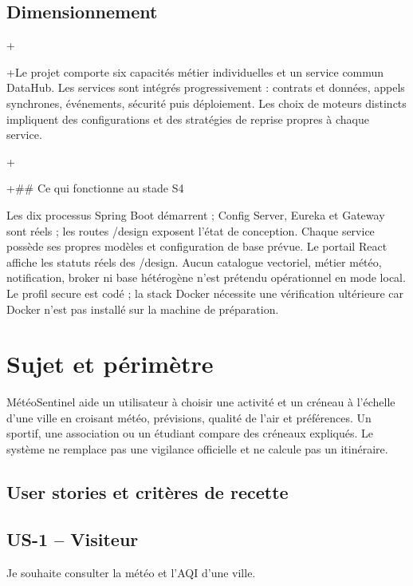 \documentclass[10pt,a4paper]{article}
\begin{document}
\subsection*{Dimensionnement}
+\par
+Le projet comporte six capacités métier individuelles et un service commun DataHub. Les services sont intégrés progressivement : contrats et données, appels synchrones, événements, sécurité puis déploiement. Les choix de moteurs distincts impliquent des configurations et des stratégies de reprise propres à chaque service.\par
+\par
+\#\# Ce qui fonctionne au stade S4\par

Les dix processus Spring Boot démarrent ; Config Server, Eureka et Gateway sont réels ; les routes /design exposent l'état de conception. Chaque service possède ses propres modèles et configuration de base prévue. Le portail React affiche les statuts réels des /design. Aucun catalogue vectoriel, métier météo, notification, broker ni base hétérogène n'est prétendu opérationnel en mode local. Le profil secure est codé ; la stack Docker nécessite une vérification ultérieure car Docker n'est pas installé sur la machine de préparation.\par
\clearpage
\section*{Sujet et périmètre}

MétéoSentinel aide un utilisateur à choisir une activité et un créneau à l'échelle d'une ville en croisant météo, prévisions, qualité de l'air et préférences. Un sportif, une association ou un étudiant compare des créneaux expliqués. Le système ne remplace pas une vigilance officielle et ne calcule pas un itinéraire.\par

\subsection*{User stories et critères de recette}

\subsection*{US-1  --  Visiteur}

Je souhaite consulter la météo et l'AQI d'une ville.\par
\end{document}
